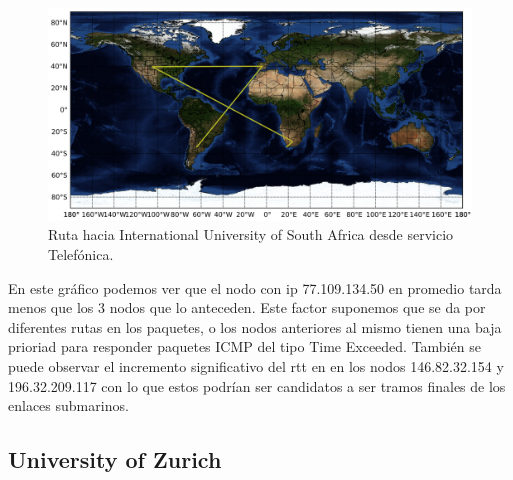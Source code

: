 \documentclass[10pt, a4paper]{article}
\begin{document}
\begin{figure}[H] %
\begin{center}
\includegraphics[width=400pt]{../imgs/map-unisa(telef).png}
\caption{Ruta hacia International University of South Africa desde servicio Telefónica.}
\end{center}
\end{figure}


En este gráfico podemos ver que el nodo con ip 77.109.134.50 en promedio tarda menos que los 3 nodos que lo anteceden. Este factor suponemos que se da por diferentes rutas en los paquetes, o los nodos anteriores al mismo tienen una baja prioriad para responder paquetes ICMP del tipo Time Exceeded.
También se puede observar el incremento significativo del rtt en en los nodos 146.82.32.154 y 196.32.209.117 con lo que estos podrían ser candidatos a ser tramos finales de los enlaces submarinos. 


\subsection{University of Zurich}
\end{document}
